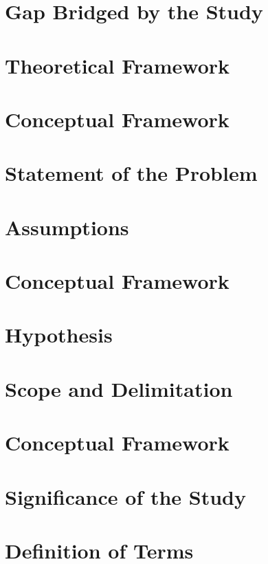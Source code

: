 \documentclass{research}
\begin{document}
\section{Gap Bridged by the Study}

\section{Theoretical Framework}

\section{Conceptual Framework}

\section{Statement of the Problem}

\section{Assumptions}

\section{Conceptual Framework}

\section{Hypothesis}

\section{Scope and Delimitation}

\section{Conceptual Framework}

\section{Significance of the Study}

\section{Definition of Terms}

\clearpage
\end{document}
